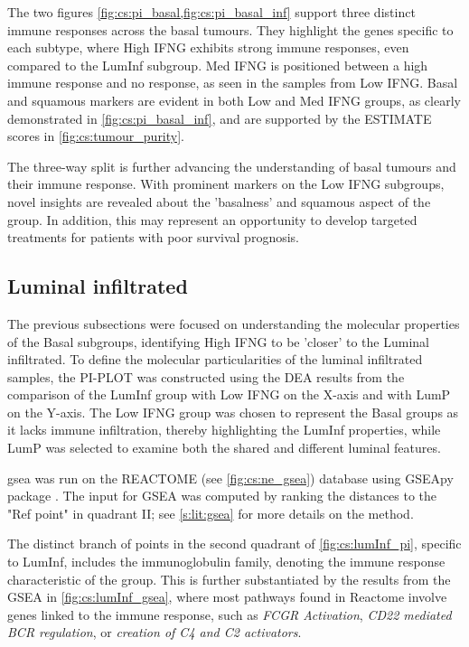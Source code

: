 The two figures \cref{fig:cs:pi_basal,fig:cs:pi_basal_inf} support three distinct immune responses across the basal tumours. They highlight the genes specific to each subtype, where High IFNG exhibits strong immune responses, even compared to the LumInf subgroup. Med IFNG is positioned between a high immune response and no response, as seen in the samples from Low IFNG. Basal and squamous markers are evident in both Low and Med IFNG groups, as clearly demonstrated in \cref{fig:cs:pi_basal_inf}, and are supported by the ESTIMATE scores in \cref{fig:cs:tumour_purity}.

The three-way split is further advancing the understanding of basal tumours and their immune response. With prominent markers on the Low IFNG subgroups, novel insights are revealed about the 'basalness' and squamous aspect of the group. In addition, this may represent an opportunity to develop targeted treatments for patients with poor survival prognosis.

\subsection{Luminal infiltrated} \label{s:cs:lumInf_interp}

The previous subsections were focused on understanding the molecular properties of the Basal subgroups, identifying High IFNG to be 'closer' to the Luminal infiltrated. To define the molecular particularities of the luminal infiltrated samples, the \gls{PI-PLOT} was constructed using the DEA results from the comparison of the LumInf group with Low IFNG on the X-axis and with LumP on the Y-axis. The Low IFNG group was chosen to represent the Basal groups as it lacks immune infiltration, thereby highlighting the LumInf properties, while LumP was selected to examine both the shared and different luminal features.

\acrfull{gsea} was run on the REACTOME (see \cref{fig:cs:ne_gsea}) database using GSEApy  package \citep{Fang2023-ec}. The input for GSEA was computed by ranking the distances to the "Ref point" in quadrant II; see \cref{s:lit:gsea} for more details on the method.

The distinct branch of points in the second quadrant of \cref{fig:cs:lumInf_pi}, specific to LumInf, includes the immunoglobulin family, denoting the immune response characteristic of the group. This is further substantiated by the results from the GSEA in \cref{fig:cs:lumInf_gsea}, where most pathways found in Reactome involve genes linked to the immune response, such as \textit{FCGR Activation}, \textit{CD22 mediated BCR regulation}, or \textit{creation of C4 and C2 activators}.



